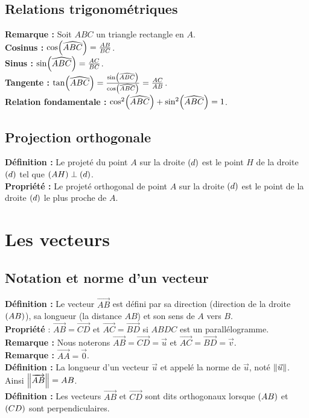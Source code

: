 \documentclass[a4paper,titlepage]{article}
\let\oldsection\section
\renewcommand\section{\clearpage\oldsection}
\let\oldleft\left
\renewcommand{\left}{\mathopen{}\mathclose\bgroup\oldleft}
\let\oldright\right
\renewcommand{\right}{\aftergroup\egroup\oldright}
\begin{document}
    \subsection{Relations trigonométriques}
        \textbf{Remarque :} Soit $ABC$ un triangle rectangle en $A$.
        \\
        \textbf{Cosinus :} $\cos\left(\widehat{ABC}\right)=\frac{AB}{BC}$.
        \\
        \textbf{Sinus :} $\sin\left(\widehat{ABC}\right)=\frac{AC}{BC}$.
        \\
        \textbf{Tangente :} $\tan\left(\widehat{ABC}\right)=\frac{\sin\left(\widehat{ABC}\right)}{\cos\left(\widehat{ABC}\right)}=\frac{AC}{AB}$.
        \\
        \textbf{Relation fondamentale :} $\cos^{2}\left(\widehat{ABC}\right)+\sin^{2}\left(\widehat{ABC}\right)=1$.
    \subsection{Projection orthogonale}
        \textbf{Définition :} Le projeté du point $A$ sur la droite $\left(d\right)$ est le point $H$ de la droite $\left(d\right)$ tel que $\left(AH\right)\perp\left(d\right)$.
        \\
        \textbf{Propriété :} Le projeté orthogonal de point $A$ sur la droite $\left(d\right)$ est le point de la droite $\left(d\right)$ le plus proche de $A$.
\section{Les vecteurs}
    \subsection{Notation et norme d’un vecteur}
        \textbf{Définition :} Le vecteur $\overrightarrow{AB}$ est défini par sa direction (direction de la droite $\left(AB\right)$), sa longueur (la distance $AB$) et son sens de $A$ vers $B$.
        \\
        \textbf{Propriété} : $\overrightarrow{AB}=\overrightarrow{CD}$ et $\overrightarrow{AC}=\overrightarrow{BD}$ si $ABDC$ est un parallélogramme.
        \\
        \textbf{Remarque :} Nous noterons $\overrightarrow{AB}=\overrightarrow{CD}=\vec{u}$ et $\overrightarrow{AC}=\overrightarrow{BD}=\vec{v}$.
        \\
        \textbf{Remarque :} $\overrightarrow{AA}=\overrightarrow{0}$.
        \\
        \textbf{Définition :} La longueur d’un vecteur $\vec{u}$ et appelé la norme de $\vec{u}$, noté $\left\|\vec{u}\right\|$. Ainsi $\left\|\overrightarrow{AB}\right\|=AB$.
        \\
        \textbf{Définition :} Les vecteurs $\overrightarrow{AB}$ et $\overrightarrow{CD}$ sont dits orthogonaux lorsque $\left(AB\right)$ et $\left(CD\right)$ sont perpendiculaires.
\end{document}
